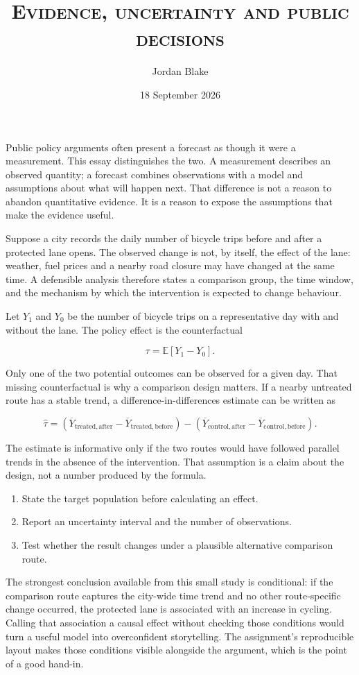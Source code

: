 \documentclass[shorttitle,repeatauthor]{uhhassignment}
\author[Jordan Blake]{Jordan Blake \id{j.blake@example.edu}}
\title{\textsc{Evidence, uncertainty and public decisions}}
\date{18 September 2026}
\begin{document}
\maketitle

Public policy arguments often present a forecast as though it were a
measurement.  This essay distinguishes the two.  A measurement describes
an observed quantity; a forecast combines observations with a model and
assumptions about what will happen next.  That difference is not a reason
to abandon quantitative evidence.  It is a reason to expose the assumptions
that make the evidence useful.

Suppose a city records the daily number of bicycle trips before and after a
protected lane opens.  The observed change is not, by itself, the effect of
the lane: weather, fuel prices and a nearby road closure may have changed at
the same time.  A defensible analysis therefore states a comparison group,
the time window, and the mechanism by which the intervention is expected to
change behaviour.

Let $Y_1$ and $Y_0$ be the number of bicycle trips on a representative day
with and without the lane.  The policy effect is the counterfactual

\[
  \tau = \mathbb{E}[Y_1-Y_0].
\]

Only one of the two potential outcomes can be observed for a given day.
That missing counterfactual is why a comparison design matters.  If a
nearby untreated route has a stable trend, a difference-in-differences
estimate can be written as

\[
 \widehat{\tau}= (\overline{Y}_{\mathrm{treated,after}}
 -\overline{Y}_{\mathrm{treated,before}})
 -(\overline{Y}_{\mathrm{control,after}}
 -\overline{Y}_{\mathrm{control,before}}).
\]

The estimate is informative only if the two routes would have followed
parallel trends in the absence of the intervention.  That assumption is a
claim about the design, not a number produced by the formula.

\begin{enumerate}[label=\alph*),leftmargin=2em]
  \item State the target population before calculating an effect.
  \item Report an uncertainty interval and the number of observations.
  \item Test whether the result changes under a plausible alternative
        comparison route.
\end{enumerate}

The strongest conclusion available from this small study is conditional:
if the comparison route captures the city-wide time trend and no other
route-specific change occurred, the protected lane is associated with an
increase in cycling.  Calling that association a causal effect without
checking those conditions would turn a useful model into overconfident
storytelling.  The assignment's reproducible layout makes those conditions
visible alongside the argument, which is the point of a good hand-in.
\end{document}
